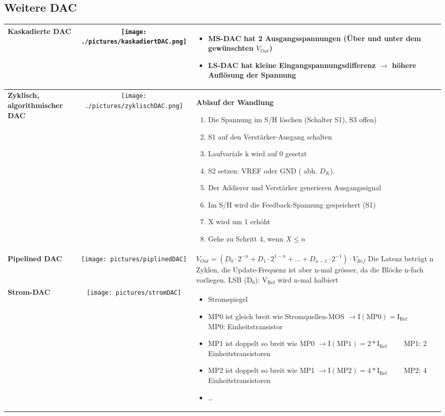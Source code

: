 \subsection{Weitere DAC}
\begin{longtable}{|>{\bfseries}p{4cm}|c|p{8cm}|}
	\hline
	Kaskadierte DAC
	& \texttt{[image: ./pictures/kaskadiertDAC.png]}
	& \begin{itemize}
  		\item MS-DAC hat 2 Ausgangsspannungen (Über und unter dem gewünschten
  			$V_{Out}$)
  		\item LS-DAC hat kleine Eingangspannungsdifferenz $\to$ höhere Auflösung der
  			Spannung
	  \end{itemize}
	\\ \hline
	Zyklisch, algorithmischer DAC \hartl{466}
	& \texttt{[image: ./pictures/zyklischDAC.png]}
	& \textbf{Ablauf der Wandlung}
	  \begin{enumerate}
  		\item Die Spannung im S/H löschen (Schalter S1), S3 offen)
  		\item S1 auf den Verstärker-Ausgang schalten
  		\item Laufvariale k wird auf 0 gesetzt
  		\item S2 setzen: VREF oder GND ( abh. $D_{K}$).
  		\item Der Addierer und Verstärker generieren Ausgangssignal
  		\item Im S/H wird die Feedback-Spannung gespeichert (S1)
  		\item X wird um 1 erhöht
  		\item Gehe zu Schritt 4, wenn $X\leq n$
	  \end{enumerate}
	\\ \hline
	Pipelined DAC 
	& \texttt{[image: pictures/piplinedDAC]}
	& $V_{Out} = (D_0 \cdot 2^{-n} + D_1 \cdot 2^{1-n} + ... + D_{n-1} \cdot 2^{-1})\cdot V_{Ref}$\newline\newline
      Die Latenz beträgt n Zyklen, die Update-Frequenz ist aber n-mal grösser, da die Blöcke n-fach vorliegen.\newline
      LSB ($\mathrm{D_0}$): $\mathrm{V_{Ref}}$ wird n-mal halbiert
	\\ \hline
	Strom-DAC
	& \texttt{[image: pictures/stromDAC]}
	& \begin{itemize}
  		\item Stromspiegel
  		\item MP0 ist gleich breit wie Stromquellen-MOS $\to \mathrm{I(MP0)=I_{Ref}} \qquad$ MP0: Einheitstransistor
  		\item MP1 ist doppelt so breit wie MP0 $\to \mathrm{I(MP1)}=2*\mathrm{I_{Ref}} \qquad$ MP1: 2 Einheitstransistoren
  		\item MP2 ist doppelt so breit wie MP1 $\to \mathrm{I(MP2)}=4*\mathrm{I_{Ref}} \qquad$ MP2: 4 Einheitstransistoren
  		\item \ldots
	  \end{itemize}
	\\ \hline
\end{longtable}

